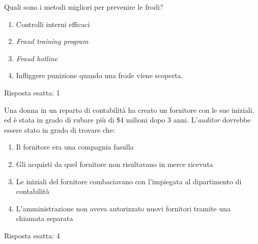 \label{EsFrodi2}

\begin{Exercise} [
  title={Prevenzione di una frode},
  label={fr4}
 ]

 \Question Quali sono i metodi migliori per prevenire le frodi?
\begin{enumerate}
  \item Controlli interni efficaci
  \item \textit{Fraud training program}
  \item \textit{Fraud hotline}
  \item Infliggere punizione quando una frode viene scoperta.
\end{enumerate}

\end{Exercise}

\begin{Answer} [
   ref={fr4},
   number={4}
 ]

  \Question Risposta esatta: 1

\end{Answer}


\begin{Exercise} [
  title={Prevenzione di una frode},
  label={fr5}
 ]

 \Question Una donna in un reparto di contabilità ha creato un fornitore con le
sue iniziali, ed è stata in grado di rubare più di \$4 milioni dopo 3 anni.
L'\textit{auditor} dovrebbe essere stato in grado di trovare che:
\begin{enumerate}
 \item Il fornitore era una compagnia fasulla
 \item Gli acquisti da quel fornitore non risultavano in merce ricevuta
 \item Le iniziali del fornitore combaciavano con l'impiegata al dipartimento
di contabilità
 \item L'amministrazione non aveva autorizzato nuovi fornitori tramite una
chiamata separata
\end{enumerate}

\end{Exercise}

\begin{Answer} [
  ref={fr5},
  number={5}
 ]

 \Question Risposta esatta: 4
\end{Answer}





